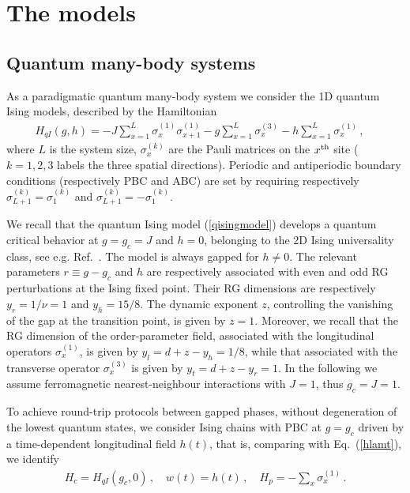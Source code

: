 \section{The models}
\label{models}





\subsection{Quantum many-body systems}
\label{quamod}

As a paradigmatic quantum many-body system we consider the 1D quantum
Ising models, described by the Hamiltonian
\begin{eqnarray}
  H_{qI}(g,h) = - J \sum_{x=1}^{L} \sigma^{(1)}_{x\phantom{1}}
  \sigma^{(1)}_{x+1} - g \sum_{x=1}^L \sigma^{(3)}_x
  - h \sum_{x=1}^L \sigma^{(1)}_x\,,\quad
  \label{qisingmodel}
\end{eqnarray}
where $L$ is the system size, $\sigma^{(k)}_x$ are the Pauli matrices
on the $x^{\rm th}$ site ($k = 1,2,3$ labels the three spatial
directions). Periodic and antiperiodic boundary conditions
(respectively PBC and ABC) are set by requiring respectively
$\sigma^{(k)}_{L+1} = \sigma^{(k)}_1$ and $\sigma^{(k)}_{L+1} =
-\sigma^{(k)}_1$.

We recall that the quantum Ising model (\ref{qisingmodel}) develops a
quantum critical behavior at $g=g_c=J$ and $h=0$, belonging to the 2D
Ising universality class, see e.g. Ref.~\cite{Sachdev-book}. The model
is always gapped for $h\neq 0$.  The relevant parameters $r\equiv
g-g_c$ and $h$ are respectively associated with even and odd RG
perturbations at the Ising fixed point.  Their RG dimensions are
respectively $y_r=1/\nu=1$ and $y_h=15/8$. The dynamic exponent $z$,
controlling the vanishing of the gap at the transition point, is given
by $z=1$. Moreover, we recall that the RG dimension of the
order-parameter field, associated with the longitudinal operators
$\sigma_x^{(1)}$, is given by $y_l=d + z - y_h=1/8$, while that
associated with the transverse operator $\sigma_x^{(3)}$ is given by
$y_t = d + z - y_r = 1$.  In the following we assume ferromagnetic
nearest-neighbour interactions with $J=1$, thus $g_c=J=1$.


To achieve round-trip protocols between gapped phases, without
degeneration of the lowest quantum states, we consider Ising chains
with PBC at $g=g_c$ driven by a time-dependent longitudinal field
$h(t)$, that is,  comparing with Eq.~(\ref{hlamt}), we identify
\begin{eqnarray}
  H_c = H_{qI}(g_c,0)\,,\quad w(t) = h(t)\,, \quad H_p = - \sum_{x}
  \sigma^{(1)}_x\,.
\label{isichoice}
\end{eqnarray}

